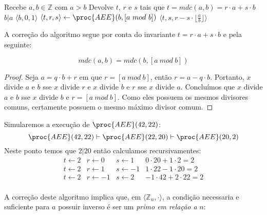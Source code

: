 \begin{codebox}
\li \Comment Recebe $a, b \in \mathbb{Z}$ com $a > b$
\li \Comment Devolve $t$, $r$ e $s$ tais que $t = mdc(a,b) = r \cdot a + s \cdot b$  
\li \If $b|a$
\li     \Then 
        \Return $\langle b, 0, 1 \rangle$
\li \Else $\langle t, r, s \rangle \gets \proc{AEE}(b, [a\ mod\ b])$
\li     \Return $\langle t, s, r - s \cdot \lfloor \frac{a}{b} \rfloor \rangle$
\End
\end{codebox}

A correção do algoritmo segue por conta do invariante $t = r \cdot a + s \cdot b$ e pela seguinte:

\begin{proposition}
\begin{displaymath}
  mdc(a,b) = mdc(b, [a\ mod\ b])  
\end{displaymath}
\end{proposition}
\begin{proof}

Seja $a = q \cdot b + r$ em que $r = [a\ mod\ b]$, então $r = a - q \cdot b$.
Portanto, $x$ divide $a$ e $b$ sse $x$ divide $r$ e $x$ divide $b$ e $r$ sse $x$ divide $a$.
Concluímos que $x$ divide $a$ e $b$ sse $x$ divide $b$ e $r = [a\ mod\ b]$.
Como eles possuem os mesmos divisores comuns, certamente possuem o mesmo máximo divisor comum.
\end{proof}

\begin{example}
    Simularemos a execução de $\proc{AEE}(42, 22)$:
    \begin{displaymath}
      \proc{AEE}(42, 22) \vdash \proc{AEE}(22, 20) \vdash \proc{AEE}(20, 2)
    \end{displaymath}
    Neste ponto temos que $2|20$ então calculamos recursivamentes:
    \begin{displaymath}
      \begin{array}{lllr}
        t \gets 2 & r \gets 0 & s \gets 1 & 0 \cdot 20 + 1 \cdot 2 = 2\\
        t \gets 2 & r \gets 1 & s \gets -1 & 1 \cdot 22 - 1 \cdot 20 = 2\\
        t \gets 2 & r \gets -1 & s \gets 2 & -1 \cdot 42 + 2 \cdot 22 = 2\\
      \end{array}
    \end{displaymath}
\end{example}

A correção deste algoritmo implica que, em $\langle \mathbb{Z}_n, \cdot \rangle$, a condição necessaria e suficiente para $a$ possuir inverso é ser um {\em primo em relação a} $n$:

